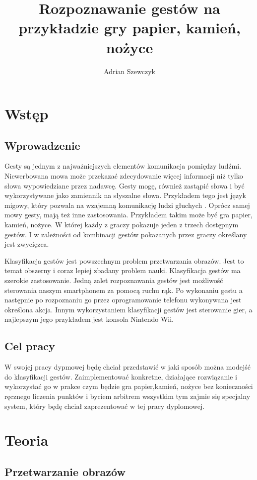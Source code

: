 \documentclass[a4paper,12pt,twoside,openany]{report}
\title{Rozpoznawanie gestów na przykładzie gry papier, kamień, nożyce}
\author{Adrian Szewczyk}
\begin{document}
\maketitle


\chapter{Wstęp}
\section{Wprowadzenie}
Gesty są jednym z najważniejszych elementów komunikacja pomiędzy ludźmi. Niewerbowana mowa może przekazać zdecydowanie więcej informacji niż tylko słowa wypowiedziane przez nadawcę. Gesty mogę, również zastąpić słowa i być wykorzystywane jako zamiennik na słyszalne słowa. Przykładem tego jest język migowy, który pozwala na wzajemną komunikację ludzi głuchych . Oprócz samej mowy gesty, mają też inne zastosowania. Przykładem takim może być gra papier, kamień, nożyce. W której każdy z graczy pokazuje jeden z trzech dostępnym gestów. I w zależności od kombinacji gestów pokazanych przez graczy określany jest zwycięzca.

Klasyfikacja gestów jest powszechnym problem przetwarzania obrazów. Jest to temat obszerny i coraz lepiej zbadany problem nauki. Klasyfikacja gestów ma szerokie zastosowanie. Jedną zalet rozpoznawania gestów jest możliwość sterowania naszym smartphonem za pomocą ruchu rąk. Po wykonaniu gestu a następnie po rozpoznaniu go przez  oprogramowanie telefonu wykonywana jest określona akcja. Innym wykorzystaniem klasyfikacji gestów jest sterowanie gier, a najlepszym jego przykładem jest konsola Nintendo Wii.

\section{Cel pracy}
W swojej pracy dypmowej będę chciał przedstawić w jaki sposób można modejść do klasyfikacji gestów. Zaimplementować konkretne, działające rozwiązanie i wykorzystać go w prakce czym będzie gra papier,kamień, nożyce bez konieczności ręcznego liczenia punktów i byciem arbitrem wszystkim tym zajmie się specjalny system, który będę chciał zaprezentować w tej pracy dyplomowej.

\chapter{Teoria}
\section{Przetwarzanie obrazów}
\end{document}
